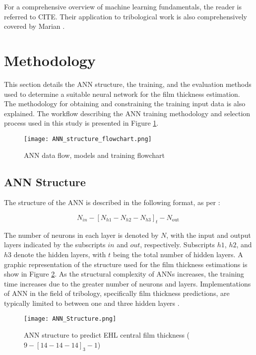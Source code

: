 For a comprehensive overview of machine learning fundamentals, the reader is referred to CITE. Their application to tribological work is also comprehensively covered by Marian \cite{Marian2021}.

\section{Methodology}

This section details the ANN structure, the training, and the evaluation methods used to determine a suitable neural network for the film thickness estimation. The methodology for obtaining and constraining the training input data is also explained. The workflow describing the ANN training methodology and selection process used in this study is presented in Figure \ref{ANN flowchart}.

\begin{figure}  
	\centering
	\texttt{[image: ANN\_structure\_flowchart.png]}
	\caption{ANN data flow, models and training flowchart}
	\label{ANN flowchart}
\end{figure} 

\subsection{ANN Structure}

The structure of the ANN is described in the following format, as per \cite{Zhang2002}:

\begin{equation}
	N_{i n}-\left[N_{h 1}-N_{h 2}-N_{h 3}\right]_t-N_{\text {out }}
\end{equation}

The number of neurons in each layer is denoted by $N$, with the input and output layers indicated by the subscripts $in$ and $out$, respectively. Subscripts $h1$, $h2$, and $h3$ denote the hidden layers, with $t$ being the total number of hidden layers. A graphic representation of the structure used for the film thickness estimations is show in Figure \ref{ANN structure}. As the structural complexity of ANNs increases, the training time increases due to the greater number of neurons and layers. Implementations of ANN in the field of tribology, specifically film thickness predictions, are typically limited to between one and three hidden layers \cite{Marian2021}.

\begin{figure}
	\centering  
	\texttt{[image: ANN\_Structure.png]}
	\caption{ANN structure to predict EHL central film thickness ($9-[14-14-14]_3-1$)}
	\label{ANN structure}
\end{figure} 

